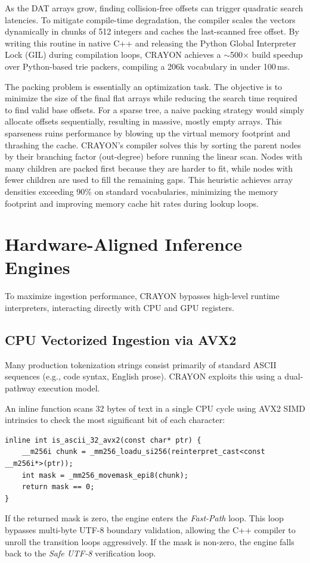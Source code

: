 \documentclass[10pt,journal,compsoc]{IEEEtran}
\begin{document}
As the DAT arrays grow, finding collision-free offsets can trigger quadratic search latencies. To mitigate compile-time degradation, the compiler scales the vectors dynamically in chunks of 512 integers and caches the last-scanned free offset. By writing this routine in native C++ and releasing the Python Global Interpreter Lock (GIL) during compilation loops, CRAYON achieves a $\sim$500$\times$ build speedup over Python-based trie packers, compiling a 206k vocabulary in under 100\,ms.

The packing problem is essentially an optimization task. The objective is to minimize the size of the final flat arrays while reducing the search time required to find valid base offsets. For a sparse tree, a naive packing strategy would simply allocate offsets sequentially, resulting in massive, mostly empty arrays. This sparseness ruins performance by blowing up the virtual memory footprint and thrashing the cache. CRAYON’s compiler solves this by sorting the parent nodes by their branching factor (out-degree) before running the linear scan. Nodes with many children are packed first because they are harder to fit, while nodes with fewer children are used to fill the remaining gaps. This heuristic achieves array densities exceeding 90\% on standard vocabularies, minimizing the memory footprint and improving memory cache hit rates during lookup loops.

\section{Hardware-Aligned Inference Engines}
To maximize ingestion performance, CRAYON bypasses high-level runtime interpreters, interacting directly with CPU and GPU registers.

\subsection{CPU Vectorized Ingestion via AVX2}
Many production tokenization strings consist primarily of standard ASCII sequences (e.g., code syntax, English prose). CRAYON exploits this using a dual-pathway execution model. 

An inline function scans 32 bytes of text in a single CPU cycle using AVX2 SIMD intrinsics to check the most significant bit of each character:
\begin{lstlisting}[caption={AVX2 SIMD ASCII Verification}]
inline int is_ascii_32_avx2(const char* ptr) {
    __m256i chunk = _mm256_loadu_si256(reinterpret_cast<const __m256i*>(ptr));
    int mask = _mm256_movemask_epi8(chunk);
    return mask == 0;
}
\end{lstlisting}
If the returned mask is zero, the engine enters the \textit{Fast-Path} loop. This loop bypasses multi-byte UTF-8 boundary validation, allowing the C++ compiler to unroll the transition loops aggressively. If the mask is non-zero, the engine falls back to the \textit{Safe UTF-8} verification loop.
\end{document}
